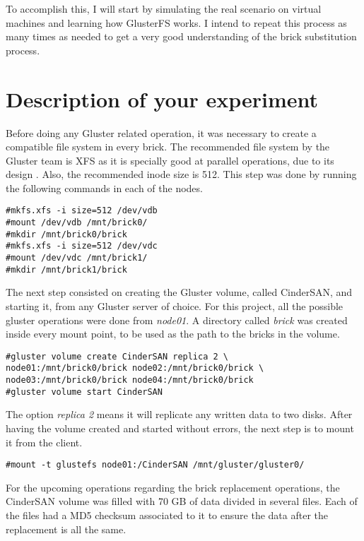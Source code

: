 To accomplish this, I will start by simulating the real scenario on virtual machines and learning how GlusterFS works. I intend to repeat this process as many times as needed to get a very good understanding of the brick substitution process.


\section{Description of your experiment}

Before doing any Gluster related operation, it was necessary to create a compatible file system in every brick. The recommended file system by the Gluster team is XFS as it is specially good at parallel operations, due to its design \cite{XFS}. Also, the recommended inode size is 512. This step was done by running the following commands in each of the nodes.

\begin{lstlisting}[frame=single]
#mkfs.xfs -i size=512 /dev/vdb
#mount /dev/vdb /mnt/brick0/
#mkdir /mnt/brick0/brick
#mkfs.xfs -i size=512 /dev/vdc
#mount /dev/vdc /mnt/brick1/
#mkdir /mnt/brick1/brick
\end{lstlisting}

The next step consisted on creating the Gluster volume, called CinderSAN, and starting it, from any Gluster server of choice. For this project, all the possible gluster operations were done from \textit{node01}. A directory called \textit{brick} was created inside every mount point, to be used as the path to the bricks in the volume.

\begin{lstlisting}[frame=single]
#gluster volume create CinderSAN replica 2 \
node01:/mnt/brick0/brick node02:/mnt/brick0/brick \
node03:/mnt/brick0/brick node04:/mnt/brick0/brick
#gluster volume start CinderSAN
\end{lstlisting}

The option \textit{replica 2} means it will replicate any written data to two disks. After having the volume created and started without errors, the next step is to mount it from the client.

\begin{lstlisting}[frame=single]
#mount -t glustefs node01:/CinderSAN /mnt/gluster/gluster0/
\end{lstlisting}

For the upcoming operations regarding the brick replacement operations, the CinderSAN volume was filled with 70 GB of data divided in several files. Each of the files had a MD5 checksum associated to it to ensure the data after the replacement is all the same.


